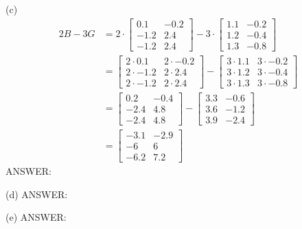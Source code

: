 (c)
\begin{align*}
2B - 3G &= 2 \cdot \begin{bmatrix}
0.1 & -0.2 \\
-1.2 & 2.4 \\
-1.2 & 2.4
\end{bmatrix}
-
3 \cdot \begin{bmatrix}
1.1 & -0.2 \\
1.2 & -0.4 \\
1.3 & -0.8
\end{bmatrix}\\
&= \begin{bmatrix}
2 \cdot 0.1 & 2 \cdot -0.2 \\
2 \cdot -1.2 & 2 \cdot 2.4 \\
2 \cdot -1.2 & 2 \cdot 2.4
\end{bmatrix}
-
\begin{bmatrix}
3 \cdot 1.1 & 3 \cdot -0.2 \\
3 \cdot 1.2 & 3 \cdot -0.4 \\
3 \cdot 1.3 & 3 \cdot -0.8
\end{bmatrix}\\
&= \begin{bmatrix}
0.2 & -0.4 \\
-2.4 & 4.8 \\
-2.4 & 4.8
\end{bmatrix}
-
\begin{bmatrix}
3.3 & -0.6 \\
3.6 & -1.2 \\
3.9 & -2.4
\end{bmatrix} \\
&=
\begin{bmatrix}
-3.1 & -2.9 \\
-6 & 6 \\
-6.2 & 7.2
\end{bmatrix}
\end{align*}
ANSWER: 

(d) ANSWER: 

(e)
ANSWER: 

